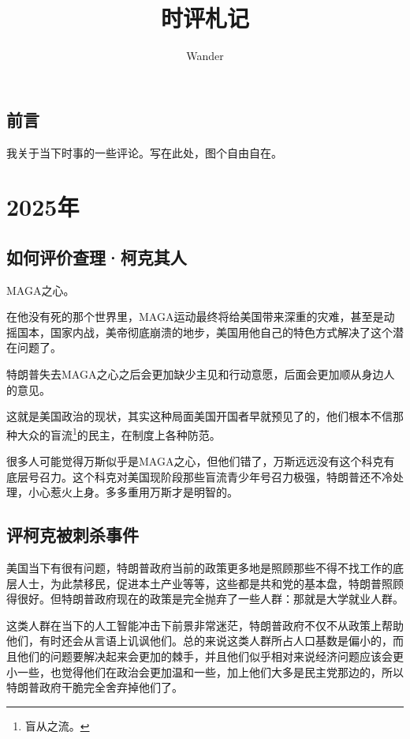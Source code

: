 \documentclass[12pt,oneside]{book}
\title{时评札记}
\author{Wander}
\begin{document}
\makemytitle



\frontmatter 
{}
\chapter*{前言}
我关于当下时事的一些评论。写在此处，图个自由自在。



\setcounter{tocdepth}{2}    
\tableofcontents


\mainmatter


\part{2025年}
\chapter{如何评价查理·柯克其人}
MAGA之心。

在他没有死的那个世界里，MAGA运动最终将给美国带来深重的灾难，甚至是动摇国本，国家内战，美帝彻底崩溃的地步，美国用他自己的特色方式解决了这个潜在问题了。

特朗普失去MAGA之心之后会更加缺少主见和行动意愿，后面会更加顺从身边人的意见。

这就是美国政治的现状，其实这种局面美国开国者早就预见了的，他们根本不信那种大众的盲流\footnote{盲从之流。}的民主，在制度上各种防范。

很多人可能觉得万斯似乎是MAGA之心，但他们错了，万斯远远没有这个科克有底层号召力。这个科克对美国现阶段那些盲流青少年号召力极强，特朗普还不冷处理，小心惹火上身。多多重用万斯才是明智的。

\chapter{评柯克被刺杀事件}
美国当下有很有问题，特朗普政府当前的政策更多地是照顾那些不得不找工作的底层人士，为此禁移民，促进本土产业等等，这些都是共和党的基本盘，特朗普照顾得很好。但特朗普政府现在的政策是完全抛弃了一些人群：那就是大学就业人群。

这类人群在当下的人工智能冲击下前景非常迷茫，特朗普政府不仅不从政策上帮助他们，有时还会从言语上讥讽他们。总的来说这类人群所占人口基数是偏小的，而且他们的问题要解决起来会更加的棘手，并且他们似乎相对来说经济问题应该会更小一些，也觉得他们在政治会更加温和一些，加上他们大多是民主党那边的，所以特朗普政府干脆完全舍弃掉他们了。
\end{document}
